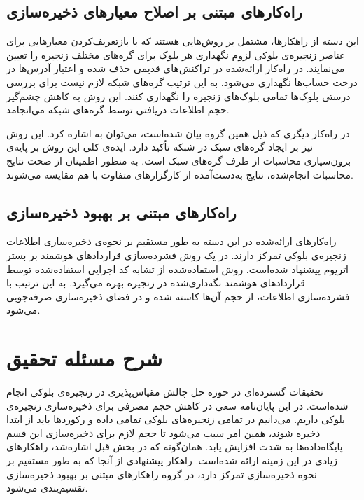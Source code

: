 \subsection{راه‌کارهای مبتنی بر اصلاح معیارهای ذخیره‌سازی}
این دسته از راهکارها، مشتمل بر روش‌هایی هستند که با بازتعریف‌کردن معیارهایی برای عناصر زنجیره‌‌ی بلوکی لزوم نگهداری هر بلوک برای گره‌های مختلف زنجیره را تعیین می‌نمایند. در راه‌کار ارائه‌شده در \cite{Bruce2017} تراکنش‌های قدیمی حذف شده و اعتبار آدرس‌ها در درخت حساب‌ها نگهداری می‌شود. به این ترتیب گره‌های شبکه لازم نیست برای بررسی درستی بلوک‌ها تمامی بلوک‌های زنجیره را نگهداری کنند. این روش به کاهش چشم‌گیر حجم اطلاعات دریافتی توسط گره‌های شبکه می‌انجامد. 

در راه‌کار دیگری که ذیل همین گروه بیان شده‌است، ‌می‌توان به \cite{VanDenHooff2014} اشاره کرد. این روش نیز بر ایجاد گره‌های سبک در شبکه تأکید دارد. ایده‌ی کلی این روش بر پایه‌ی برون‌سپاری محاسبات از طرف گره‌های سبک است. به منظور اطمینان از صحت نتایج محاسبات انجام‌شده، نتایج به‌دست‌آمده از کارگزارهای متفاوت با هم مقایسه می‌شوند.

\subsection{راه‌کارهای مبتنی بر بهبود ذخیره‌سازی}
راه‌کارهای ارائه‌شده در این دسته به طور مستقیم بر نحوه‌ی ذخیره‌سازی اطلاعات زنجیره‌ی بلوکی تمرکز دارند. در \cite{Pontiveros2018} یک روش فشرده‌سازی قراردادهای هوشمند بر بستر اتریوم پیشنهاد شده‌است. روش استفاده‌شده از تشابه کد اجرایی استفاده‌شده توسط قراردادهای هوشمند نگه‌داری‌شده در زنجیره بهره می‌گیرد. به این ترتیب با فشرده‌سازی اطلاعات، از حجم آن‌ها کاسته شده و در فضای ذخیره‌سازی صرفه‌جویی می‌شود.

\section{شرح مسئله تحقیق}
تحقیقات گسترده‌ای در حوزه حل چالش مقیاس‌پذیری در زنجیره‌ی بلوکی انجام شده‌است. در این پایان‌نامه سعی در کاهش حجم مصرفی برای ذخیره‌سازی زنجیره‌ی بلوکی داریم. می‌دانیم در تمامی زنجیره‌های بلوکی تمامی داده و رکوردها باید از ابتدا ذخیره شوند، همین امر سبب می‌شود تا حجم لازم برای ذخیره‌سازی این قسم پایگاه‌داده‌ها به شدت افزایش یابد. همان‌گونه که در بخش قبل اشاره‌شد، راهکارهای زیادی در این زمینه ارائه شده‌است. راهکار پیشنهادی از آنجا که به طور مستقیم بر نحوه ذخیره‌سازی تمرکز دارد، در گروه راهکارهای مبتنی بر بهبود ذخیره‌سازی تقسیم‌یندی می‌شود. 

